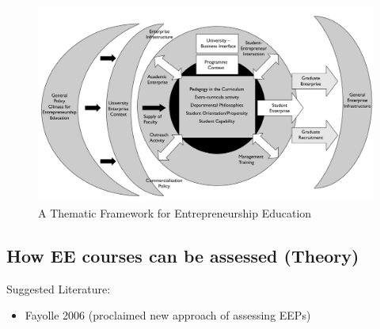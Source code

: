 \begin{figure}[h]
\begin{center}
\includegraphics[width=\textwidth]{images/framework-EE}
\caption{A Thematic Framework for Entrepreneurship Education}
\label{fig:framework-EE}
\end{center}
\end{figure}

\subsection{How EE courses can be assessed (Theory)}
Suggested Literature:\\
\begin{itemize}
\item Fayolle 2006 (proclaimed new approach of assessing EEPs)
\end{itemize}

